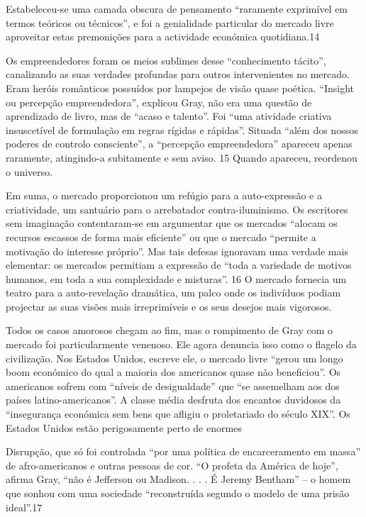  \par 
Estabeleceu-se uma camada obscura de pensamento “raramente exprimível em termos teóricos ou técnicos”, e foi a genialidade particular do mercado livre aproveitar estas premonições para a actividade económica quotidiana.{\color{blue}14}
 \par 
Os empreendedores foram os meios sublimes desse “conhecimento tácito”, canalizando as suas verdades profundas para outros intervenientes no mercado. Eram heróis românticos possuídos por lampejos de visão quase poética. “Insight ou percepção empreendedora”, explicou Gray, não era uma questão de aprendizado de livro, mas de “acaso e talento”. Foi “uma atividade criativa insuscetível de formulação em regras rígidas e rápidas”. Situada “além dos nossos poderes de controlo consciente”, a “percepção empreendedora” apareceu apenas raramente, atingindo-a subitamente e sem aviso. {\color{blue}15} Quando apareceu, reordenou o universo.
 \par 
Em suma, o mercado proporcionou um refúgio para a auto-expressão e a criatividade, um santuário para o arrebatador contra-iluminismo. Os escritores sem imaginação contentaram-se em argumentar que os mercados “alocam os recursos escassos de forma mais eficiente” ou que o mercado “permite a motivação do interesse próprio”. Mas tais defesas ignoravam uma verdade mais elementar: os mercados permitiam a expressão de “toda a variedade de motivos humanos, em toda a sua complexidade e misturas”. {\color{blue}16} O mercado fornecia um teatro para a auto-revelação dramática, um palco onde os indivíduos podiam projectar as suas visões mais irreprimíveis e os seus desejos mais vigorosos.
 \par 
Todos os casos amorosos chegam ao fim, mas o rompimento de Gray com o mercado foi particularmente venenoso. Ele agora denuncia isso como o flagelo da civilização. Nos Estados Unidos, escreve ele, o mercado livre “gerou um longo boom económico do qual a maioria dos americanos quase não beneficiou”. Os americanos sofrem com “níveis de desigualdade” que “se assemelham aos dos países latino-americanos”. A classe média desfruta dos encantos duvidosos da “insegurança económica sem bens que afligiu o proletariado do século XIX”. Os Estados Unidos estão perigosamente perto de enormes
 \par 
Disrupção, que só foi controlada “por uma política de encarceramento em massa” de afro-americanos e outras pessoas de cor. “O profeta da América de hoje”, afirma Gray, “não é Jefferson ou Madison. . . . É Jeremy Bentham” – o homem que sonhou com uma sociedade “reconstruída segundo o modelo de uma prisão ideal”.{\color{blue}17}
